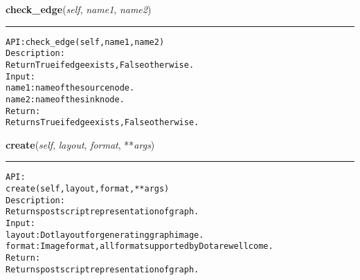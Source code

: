     \label{coinor:gimpy:graph:Graph:check_edge}

    \vspace{0.5ex}

\hspace{.8\funcindent}\begin{boxedminipage}{\funcwidth}

    \raggedright \textbf{check\_edge}(\textit{self}, \textit{name1}, \textit{name2})

    \vspace{-1.5ex}

    \rule{\textwidth}{0.5\fboxrule}
\setlength{\parskip}{2ex}
\begin{alltt}

API: check\_edge(self, name1, name2)
Description:
Return True if edge exists, False otherwise.
Input:
    name1: name of the source node.
    name2: name of the sink node.
Return:
    Returns True if edge exists, False otherwise.
\end{alltt}

\setlength{\parskip}{1ex}
    \end{boxedminipage}

    \label{coinor:gimpy:graph:Graph:create}

    \vspace{0.5ex}

\hspace{.8\funcindent}\begin{boxedminipage}{\funcwidth}

    \raggedright \textbf{create}(\textit{self}, \textit{layout}, \textit{format}, **\textit{args})

    \vspace{-1.5ex}

    \rule{\textwidth}{0.5\fboxrule}
\setlength{\parskip}{2ex}
\begin{alltt}

API:
    create(self, layout, format, **args)
Description:
    Returns postscript representation of graph.
Input:
    layout: Dot layout for generating graph image.
    format: Image format, all format supported by Dot are wellcome.
Return:
    Returns postscript representation of graph.
\end{alltt}

\setlength{\parskip}{1ex}
    \end{boxedminipage}

